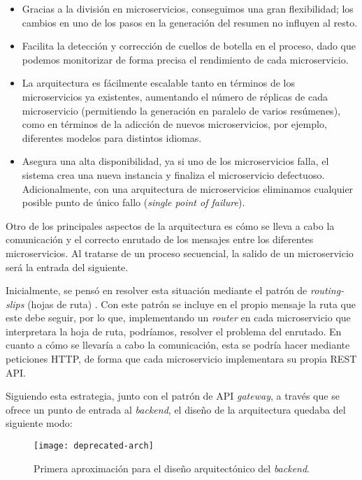 \vspace{-0.2cm}
\begin{itemize} [\textbullet]
	\item Gracias a la división en microservicios, conseguimos una gran flexibilidad; los cambios en uno de los pasos en la generación del resumen no influyen al resto.
	
	\item Facilita la detección y corrección de cuellos de botella en el proceso, dado que podemos monitorizar de forma precisa el rendimiento de cada microservicio.
	
	\item La arquitectura es fácilmente escalable tanto en términos de los microservicios ya existentes, aumentando el número de réplicas de cada microservicio (permitiendo la generación en paralelo de varios resúmenes), como en términos de la adicción de nuevos microservicios, por ejemplo, diferentes modelos para distintos idiomas.
	
	\item Asegura una alta disponibilidad, ya si uno de los microservicios falla, el sistema crea una nueva instancia y finaliza el microservicio defectuoso. Adicionalmente, con una arquitectura de microservicios eliminamos cualquier posible punto de único fallo (\emph{single point of failure}).
\end{itemize}

Otro de los principales aspectos de la arquitectura es cómo se lleva a cabo la comunicación y el correcto enrutado de los mensajes entre los diferentes microservicios. Al tratarse de un proceso secuencial, la salido de un microservicio será la entrada del siguiente.

Inicialmente, se pensó en resolver esta situación mediante el patrón de \emph{routing-slips} (hojas de ruta) \cite{routing-slip}. Con este patrón se incluye en el propio mensaje la ruta que este debe seguir, por lo que, implementando un \emph{router} en cada microservicio que interpretara la hoja de ruta, podríamos, resolver el problema del enrutado. En cuanto a cómo se llevaría a cabo la comunicación, esta se podría hacer mediante peticiones HTTP, de forma que cada microservicio implementara su propia REST API.

Siguiendo esta estrategia, junto con el patrón de API \emph{gateway}, a través que se ofrece un punto de entrada al \emph{backend}, el diseño de la arquitectura quedaba del siguiente modo:

\begin{figure}[h]
	\centering
	\texttt{[image: deprecated-arch]}
	\vspace{-0.5cm}
	\caption{Primera aproximación para el diseño arquitectónico del \emph{backend}.}
\end{figure}

